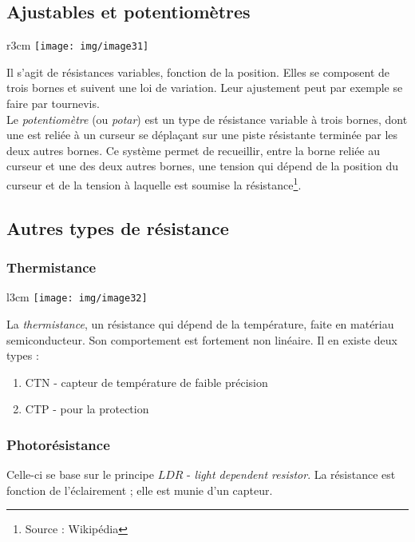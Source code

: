 \subsection{Ajustables et potentiomètres}
\begin{wrapfigure}[9]{r}{3cm}
	\texttt{[image: img/image31]}
\end{wrapfigure}

Il s'agit de résistances variables, fonction de la position. Elles se composent de trois bornes et suivent une loi de variation. Leur ajustement peut par exemple se faire par tournevis.\\

Le \textit{potentiomètre} (ou \textit{potar}) est un type de résistance variable à trois bornes, dont une est reliée à un curseur se déplaçant sur une piste résistante terminée par les deux autres bornes. Ce système permet de recueillir, entre la borne reliée au curseur et une des deux autres bornes, une tension qui dépend de la position du curseur et de la tension à laquelle est soumise la résistance\footnote{Source : Wikipédia}.

\subsection{Autres types de résistance}
\subsubsection{Thermistance}
\begin{wrapfigure}[6]{l}{3cm}
	\texttt{[image: img/image32]}
\end{wrapfigure}
La \textit{thermistance}, un résistance qui dépend de la température, faite en matériau semiconducteur. Son comportement est fortement non linéaire. Il en existe deux types :
\begin{enumerate}
	\item CTN - capteur de température de faible précision
	\item CTP - pour la protection
\end{enumerate}%

\subsubsection{Photorésistance}
Celle-ci se base sur le principe $LDR$ - \textit{light dependent resistor}. La résistance est fonction de l'éclairement ; elle est munie d'un capteur. 



